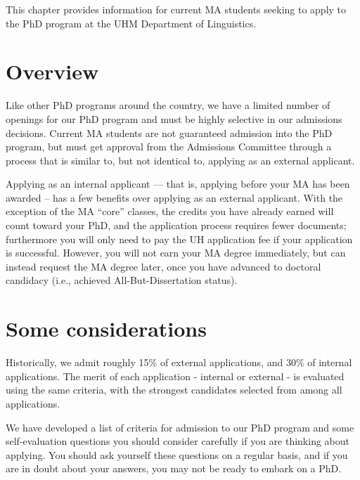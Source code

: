 \documentclass[
]{book}
\begin{document}
This chapter provides information for current MA students seeking to apply to the PhD program at the UHM Department of Linguistics.

\section{Overview}\label{overview}

Like other PhD programs around the country, we have a limited number of openings for our PhD program and must be highly selective in our admissions decisions. Current MA students are not guaranteed admission into the PhD program, but must get approval from the Admissions Committee through a process that is similar to, but not identical to, applying as an external applicant.

Applying as an internal applicant --- that is, applying before your MA has been awarded -- has a few benefits over applying as an external applicant. With the exception of the MA ``core'' classes, the credits you have already earned will count toward your PhD, and the application process requires fewer documents; furthermore you will only need to pay the UH application fee if your application is successful. However, you will not earn your MA degree immediately, but can instead request the MA degree later, once you have advanced to doctoral candidacy (i.e., achieved All-But-Dissertation status).

\section{Some considerations}\label{some-considerations}

Historically, we admit roughly 15\% of external applications, and 30\% of internal applications. The merit of each application - internal or external - is evaluated using the same criteria, with the strongest candidates selected from among all applications.

We have developed a list of criteria for admission to our PhD program and some self-evaluation questions you should consider carefully if you are thinking about applying. You should ask yourself these questions on a regular basis, and if you are in doubt about your answers, you may not be ready to embark on a PhD.
\end{document}
